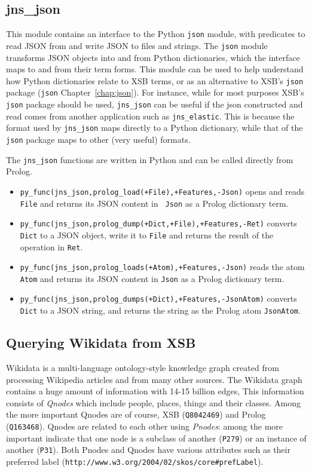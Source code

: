 \subsection{jns\_json}
This module contains an interface to the Python {\tt json} module,
with predicates to read JSON from and write JSON to files and strings.
The {\tt json} module transforms JSON objects into and from Python
dictionaries, which the interface maps to and from their term forms.
This module can be used to help understand how Python dictionaries
relate to XSB terms, or as an alternative to XSB's {\tt json} package
({\tt json} Chapter~\ref{chap:json}).  For instance, while for most
purposes XSB's {\tt json} package should be used, {\tt jns\_json} can
be useful if the json constructed and read comes from another \janus{}
application such as {\tt jns\_elastic}.  This is because the format
used by {\tt jns\_json} maps directly to a Python dictionary, while
that of the {\tt json} package maps to other (very useful) formats.

The {\tt jns\_json} functions are written in Python and can be
called directly from Prolog.
\begin{itemize}
\item {\tt py\_func(jns\_json,prolog\_load(+File),+Features,-Json)}
  opens and reads {\tt File} and returns its JSON content in {\tt
    Json} as a Prolog dictionary term.
\item {\tt py\_func(jns\_json,prolog\_dump(+Dict,+File),+Features,-Ret)}
  converts {\tt Dict} to a JSON object, write it to {\tt File} and
  returns the result of the operation in {\tt Ret}.
\item {\tt py\_func(jns\_json,prolog\_loads(+Atom),+Features,-Json)}
  reads the atom {\tt Atom} and returns its JSON content in {\tt Json}
  as a Prolog dictionary term.
\item {\tt  py\_func(jns\_json,prolog\_dumps(+Dict),+Features,-JsonAtom)}
  converts {\tt Dict} to a JSON string, and returns the string as the
  Prolog atom {\tt JsonAtom}.
\end{itemize}  

\subsection{Querying Wikidata from XSB}
%

Wikidata is a multi-language ontology-style knowledge graph created
from processing Wikipedia articles and from many other sources.  The
Wikidata graph contains a huge amount of information with 14-15
billion edges, This information consists of {\em Qnodes} which include
people, places, things and their classes.  Among the more important
Qnodes are of course, XSB ({\tt Q8042469}) and Prolog ({\tt Q163468}).
Qnodes are related to each other using {\em Pnodes}: among the more
important indicate that one node is a subclass of another ({\tt P279})
or an instance of another ({\tt P31}).  Both Pnodes and Qnodes have
various attributes such as their preferred label
(\verb|http://www.w3.org/2004/02/skos/core#prefLabel|).

